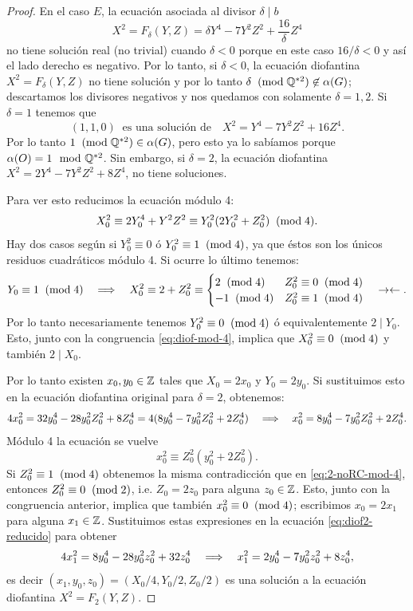 \begin{proof}
En el caso $E$, la ecuación asociada al divisor $\delta\mid b$
\[
	X^2=F_\delta(Y,Z)=\delta Y^4-7 Y^2 Z^2+\frac{16}{\delta}Z^4
\]
no tiene solución real (no trivial) cuando $\delta<0$ porque en este caso $16/\delta<0$ y así el lado derecho es negativo. Por lo tanto, si $\delta<0$, la ecuación diofantina $X^2=F_\delta(Y,Z)$ no tiene solución y por lo tanto $\delta\;\;(\mathrm{mod}\; \mathbb{Q}^{*2})\not\in\alpha(G)$; descartamos los divisores negativos y nos quedamos con solamente $\delta=1,2$. Si $\delta=1$ tenemos que
\[
	(1,1,0)\;\;\text{es una solución de}\quad X^2=Y^4-7 Y^2 Z^2+16Z^4.
\]
Por lo tanto $1\;\;(\mathrm{mod}\; \mathbb{Q}^{*2})\in\alpha(G)$, pero esto ya lo sabíamos porque $\alpha(O)=1\mod{\mathbb{Q}^{*2}}$. Sin embargo, si $\delta=2$, la ecuación diofantina $X^2=2Y^4-7 Y^2 Z^2+8 Z^4$, no tiene soluciones.

Para ver esto reducimos la ecuación módulo 4:
\begin{equation}\label{eq:diof-mod-4}
	X_0^2\equiv 2 Y_0^4+Y^2 Z^2\equiv Y_0^2(2Y_0^2+Z_0^2) \;\;(\mathrm{mod}\; 4).
\end{equation}
Hay dos casos según si $Y_0^2\equiv0$ ó $Y_0^2\equiv1\;\;(\mathrm{mod}\; 4)$, ya que éstos son los únicos residuos cuadráticos módulo 4. Si ocurre lo último tenemos:
\begin{equation}\label{eq:2-noRC-mod-4}
	Y_0\equiv1\;\;(\mathrm{mod}\; 4)\quad\Longrightarrow\quad
	X_0^2\equiv 2+Z_0^2\equiv\begin{cases}2\;\;(\mathrm{mod}\; 4) & Z_0^2\equiv0\;\;(\mathrm{mod}\; 4)\\ -1\;\;(\mathrm{mod}\; 4) & Z_0^2\equiv1\;\;(\mathrm{mod}\; 4) \end{cases}
	\quad\rightarrow\leftarrow.
\end{equation}
Por lo tanto necesariamente tenemos $Y_0^2\equiv0\;\;(\mathrm{mod}\; 4)$ ó equivalentemente $2\mid Y_0$. Esto, junto con la congruencia \eqref{eq:diof-mod-4}, implica que $X_0^2\equiv0\;\;(\mathrm{mod}\; 4)$ y también $2\mid X_0$.

Por lo tanto existen $x_0,y_0\in\mathbb{Z}$ tales que $X_0=2x_0$ y $Y_0=2y_0$. Si sustituimos esto en la ecuación diofantina original para $\delta=2$, obtenemos:
\begin{equation}\label{eq:diof2-reducido}
	4x_0^2= 32 y_0^4-28y_0^2 Z_0^2+8Z_0^4=4(8 y_0^4-7y_0^2 Z_0^2+2Z_0^4)\quad\Longrightarrow\quad
	x_0^2=8 y_0^4-7y_0^2 Z_0^2+2Z_0^4.
\end{equation}
Módulo 4 la ecuación se vuelve
\[
	x_0^2\equiv Z_0^2(y_0^2+2Z_0^2).
\]
Si $Z_0^2\equiv1\;\;(\mathrm{mod}\; 4)$ obtenemos la misma contradicción que en \eqref{eq:2-noRC-mod-4}, entonces $Z_0^2\equiv0\;\;(\mathrm{mod}\; 2)$, i.e. $Z_0=2z_0$ para alguna $z_0\in\mathbb{Z}$. Esto, junto con la congruencia anterior, implica que también $x_0^2\equiv0\;\;(\mathrm{mod}\; 4)$; escribimos $x_0=2x_1$ para alguna $x_1\in\mathbb{Z}$. Sustituimos estas expresiones en la ecuación \eqref{eq:diof2-reducido} para obtener
\[
	4x_1^2=8 y_0^4-28y_0^2 z_0^2+32z_0^4\quad\Longrightarrow\quad
	x_1^2=2y_0^4-7y_0^2z_0^2+8z_0^4,
\]
es decir $(x_1,y_0,z_0)=(X_0/4,Y_0/2,Z_0/2)$ es una solución a la ecuación diofantina $X^2=F_2(Y,Z)$.


\end{proof}
